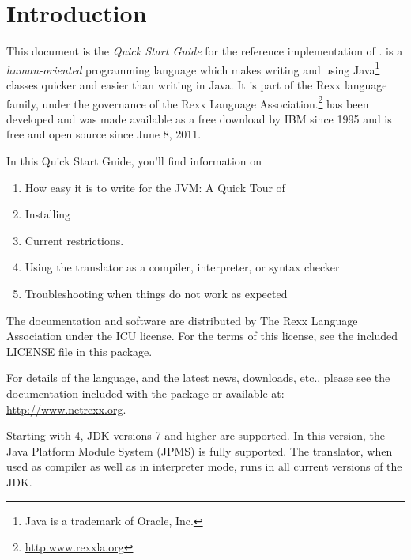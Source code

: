 \chapter{Introduction}
This document is the \emph{Quick Start Guide} for the reference implementation of
\nr{}. \nr{} is a \emph{human-oriented} programming language which makes
writing and using Java\footnote{Java is a trademark of Oracle, Inc.}
classes quicker and easier than writing in Java. It is part of the Rexx
language family, under the governance of the Rexx Language
Association.\footnote{\url{http.www.rexxla.org}} \nr{} has been
developed and was made available as a free download by IBM since 1995
and is free and open source since June 8, 2011.

In this Quick Start Guide, you’ll find information on
\begin{enumerate} 
\item How easy it is to write for the JVM: A Quick Tour of \nr{}
\item Installing \nr{} 
\item Current restrictions.
\item Using the \nr{} translator as a compiler, interpreter, or 
  syntax checker 
\item Troubleshooting when things do not work as expected
\end{enumerate} 
The \nr{} documentation and software are distributed
by The Rexx Language Association under the \textsc{ICU} license. For
the terms of this license, see the included \textsc{LICENSE} file in
this package.

For details of the \nr{} language, and the latest news, downloads,
etc., please see the \nr{} documentation included with the package
or available at: \url{http://www.netrexx.org}.

\begin{shaded}\noindent
Starting with \nr{} 4, JDK versions 7 and higher are supported. In
this version, the Java Platform Module System (JPMS) is fully
supported. The translator, when used as compiler as well as in
interpreter mode, runs in all current versions of the JDK.
\end{shaded}\indent
